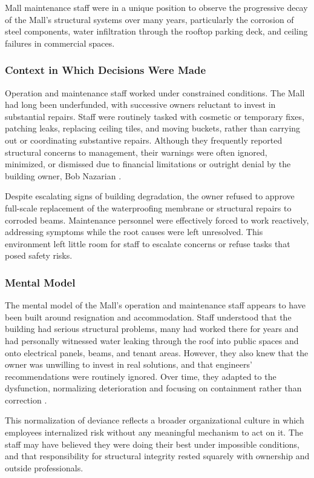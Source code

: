 \documentclass[12pt]{article}
\begin{document}
Mall maintenance staff were in a unique position to observe the progressive decay of the Mall’s structural systems over many years, particularly the corrosion of steel components, water infiltration through the rooftop parking deck, and ceiling failures in commercial spaces.

\subsubsection*{Context in Which Decisions Were Made}

Operation and maintenance staff worked under constrained conditions. The Mall had long been underfunded, with successive owners reluctant to invest in substantial repairs. Staff were routinely tasked with cosmetic or temporary fixes, patching leaks, replacing ceiling tiles, and moving buckets, rather than carrying out or coordinating substantive repairs. Although they frequently reported structural concerns to management, their warnings were often ignored, minimized, or dismissed due to financial limitations or outright denial by the building owner, Bob Nazarian \cite[p241–243]{AlgoLakeReport1}.

Despite escalating signs of building degradation, the owner refused to approve full-scale replacement of the waterproofing membrane or structural repairs to corroded beams. Maintenance personnel were effectively forced to work reactively, addressing symptoms while the root causes were left unresolved. This environment left little room for staff to escalate concerns or refuse tasks that posed safety risks.

\subsubsection*{Mental Model}

The mental model of the Mall’s operation and maintenance staff appears to have been built around resignation and accommodation. Staff understood that the building had serious structural problems, many had worked there for years and had personally witnessed water leaking through the roof into public spaces and onto electrical panels, beams, and tenant areas. However, they also knew that the owner was unwilling to invest in real solutions, and that engineers' recommendations were routinely ignored. Over time, they adapted to the dysfunction, normalizing deterioration and focusing on containment rather than correction \cite[p243]{AlgoLakeReport1}.

This normalization of deviance reflects a broader organizational culture in which employees internalized risk without any meaningful mechanism to act on it. The staff may have believed they were doing their best under impossible conditions, and that responsibility for structural integrity rested squarely with ownership and outside professionals.
\end{document}
